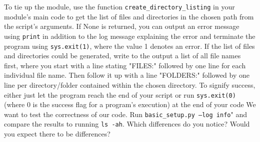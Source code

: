 \documentclass[]{erlangen-problemset}
\begin{document}
\begin{problem}[title={Type checking}]
\Question To tie up the module, use the function \texttt{create\_directory\_listing} in your module's main code to get the list of files and directories in the chosen path from the script's arguments. 
If None is returned, you can output an error message using \texttt{print} in addition to the log message explaining the error and terminate the program using \texttt{sys.exit(1)}, where the value 1 denotes an error. 
If the list of files and directories could be generated, write to the output a list of all file names first, where you start with a line stating "FILES:" followed by one line for each individual file name. 
Then follow it up with a line "FOLDERS:" followed by one line per directory/folder contained within the chosen directory. 
To signify success, either just let the program reach the end of your script or run \texttt{sys.exit(0)} (where 0 is the success flag for a program's execution) at the end of your code
\Question We want to test the correctness of our code. 
Run \texttt{basic\_setup.py --log info}" and compare the results to running \texttt{ls -ah}. 
Which differences do you notice? 
Would you expect there to be differences?
\end{problem}
\end{document}
